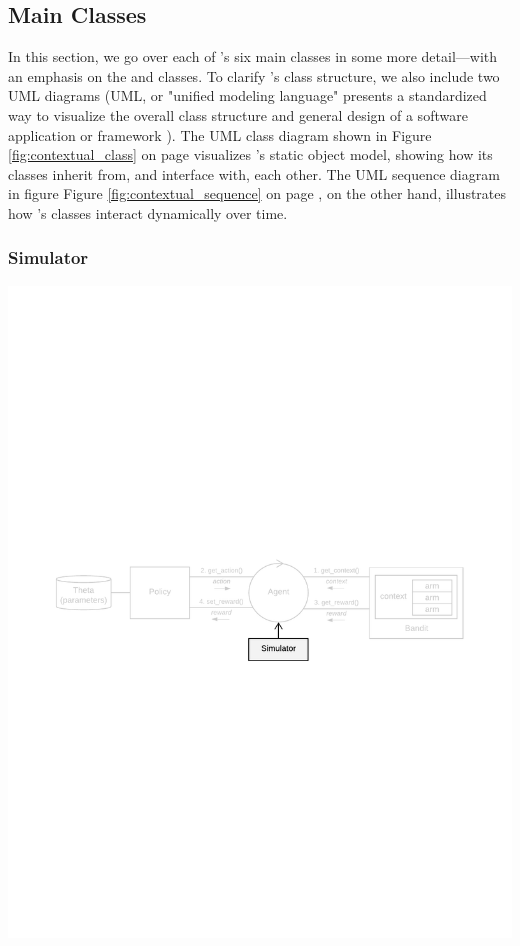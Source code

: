 \documentclass{jss}
\begin{document}
\subsection{Main Classes} \label{mainclasses}

In this section, we go over each of 's six main classes in some more detail---with an emphasis on the  and  classes. To clarify 's class structure, we also include two UML diagrams (UML, or "unified modeling language" presents a standardized way to visualize the overall class structure and general design of a software application or framework \citep{Rumbaugh2004}). The UML class diagram shown in Figure \ref{fig:contextual_class} on page \pageref{fig:contextual_class} visualizes 's static object model, showing how its classes inherit from, and interface with, each other. The UML sequence diagram in figure Figure \ref{fig:contextual_sequence} on page \pageref{fig:contextual_sequence}, on the other hand, illustrates how 's classes interact dynamically over time.

\subsubsection{Simulator}

\includegraphics[width=\textwidth]{fig/all_cmab_phases_Part1}
\end{document}
